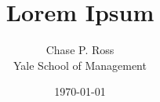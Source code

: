 \documentclass{article}
\theoremstyle{definition}
\begin{document}
\title{Lorem Ipsum}
\date{\today}
\author{Chase P. Ross \\ Yale School of Management}
\maketitle
\tableofcontents
\newpage

\label{sec:real-analysis}


\label{sec:linear-algebra}

\end{document}

